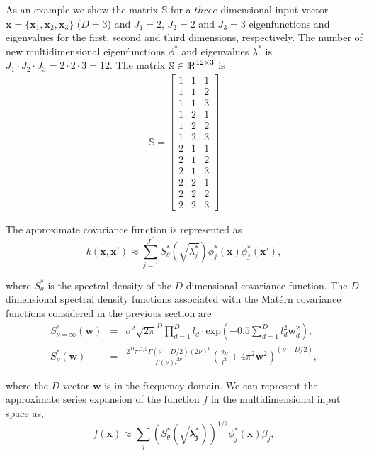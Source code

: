 \documentclass[]{interact}
\theoremstyle{plain}%
\theoremstyle{definition}
\theoremstyle{remark}
\begin{document}
As an example we show the matrix $\mathbb{S}$ for a $three$-dimensional input vector $\mathbf{x}=\{\mathbf{x}_1,\mathbf{x}_2,\mathbf{x}_3\}$ ($D=3$) and $J_{1}=2$, $J_{2}=2$ and $J_{3}=3$ eigenfunctions and eigenvalues for the first, second and third dimensions, respectively. The number of new multidimensional eigenfunctions $\phi^{\ast}$ and eigenvalues $\lambda^{\ast}$ is $J_{1}\cdot J_{2}\cdot J_{3}=2\cdot 2\cdot 3=12$. The matrix $\mathbb{S}\in {\rm I\!R}^{12 \times 3}$ is
%
\begin{eqnarray}
\mathbb{S}=
\left[ {\begin{array}{ccc}
1 & 1 & 1 \nonumber \\
1 & 1 & 2 \\
1 & 1 & 3 \\
1 & 2 & 1 \\
1 & 2 & 2 \\
1 & 2 & 3 \\
2 & 1 & 1 \\
2 & 1 & 2 \\
2 & 1 & 3 \\
2 & 2 & 1 \\
2 & 2 & 2 \\
2 & 2 & 3 
\end{array} } \right]
\end{eqnarray} 


The approximate covariance function is represented as
%
\begin{equation}\label{approxcov_multi}
k(\mathbf{x},\mathbf{x}') \approx \sum_{j=1}^{J^D} S^{\ast}_{\theta}\left(\sqrt{\lambda^{\ast}_j}\right) \phi^{\ast}_j(\mathbf{x}) \phi^{\ast}_j(\mathbf{x}'),
\end{equation}

\noindent where $S^{\ast}_{\theta}$ is the spectral density of the $D$-dimensional covariance function. The $D$-dimensional spectral density functions associated with the Mat\'ern covariance functions considered in the previous section are
%
\begin{eqnarray}
S^{\ast}_{\nu=\infty}(\mathbf{w})&=& \sigma^2 \sqrt{2\pi}^D \prod_{d=1}^D l_d \cdot \text{exp}\left(-0.5 \sum_{d=1}^D l_d^2 \mathbf{w}_d^2\right), \nonumber \\
%
S^{\ast}_{\nu}(\mathbf{w})&=& \frac{2^D\pi^{D/2}\Gamma(\nu+D/2)(2\nu)^{\nu}}{\Gamma(\nu)l^{2\nu}}\left(\frac{2\nu}{l^2}+4\pi^2\mathbf{w}^2 \right)^{(\nu+D/2)}, \nonumber
\end{eqnarray}

\noindent where the $D$-vector $\mathbf{w}$ is in the frequency domain. We can represent the approximate series expansion of the function $f$ in the multidimensional input space as,
%
\begin{equation}\label{approxf}
f(\mathbf{x}) \approx \sum_{j} \left( S^{\ast}_{\theta}(\sqrt{\boldsymbol{\lambda^{\ast}_j}})\right)^{1/2} \phi^{\ast}_j(\mathbf{x}) \beta_j, 
\end{equation}
\end{document}
